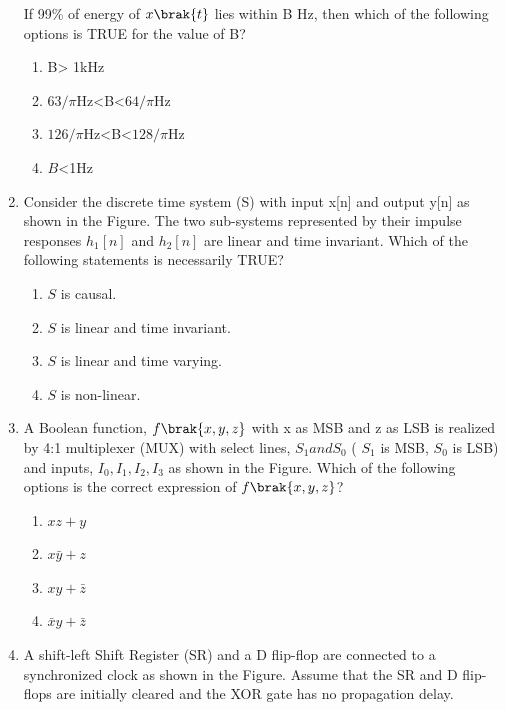 \begin{enumerate}[label=\thesubsection.\arabic*,ref=\thesubsection.\theenumi]
	If 99\% of energy of $x\brak{t}$ lies within B Hz, then which of the following options is
TRUE for the value of B? 
\begin{enumerate}
	\item B> 1kHz
	\item $63/\pi$Hz<B<$64/\pi$Hz
	\item $126/\pi$Hz<B<$128/\pi$Hz
	\item $B$<1Hz
\end{enumerate}
\item Consider the discrete time system (S) with input x[n] and output y[n] as shown in
	the Figure. The two sub-systems represented by their impulse responses $h_1[n]$
and $h_2[n]$ are linear and time invariant. Which of the following statements is necessarily TRUE?
\begin{enumerate}
	\item $S$ is causal.
	\item $S$ is linear and time invariant.
	\item $S$ is linear and time varying.
	\item $S$ is non-linear.
\end{enumerate}
\item A Boolean function, $f\brak{x,y,z}$ with x as MSB and z as LSB is realized by 4:1
	multiplexer (MUX) with select lines, $S_1 and S_0$ ( $S_1$ is MSB, $S_0$ is LSB) and inputs,
$I_0, I_1, I_2, I_3$ as shown in the Figure.
Which of the following options is the correct expression of $f\brak{x,y,z}$?
\begin{multicols}{4}
	\begin{enumerate}
		\item $xz+y$
		\item $x\bar{y}+z$
		\item $xy+\bar{z}$
		\item $\bar{x}y+\bar{z}$
	\end{enumerate}
\end{multicols}
\item A shift-left Shift Register (SR) and a D flip-flop are connected to a synchronized
clock as shown in the Figure. Assume that the SR and D flip-flops are initially
cleared and the XOR gate has no propagation delay.

\end{enumerate}
